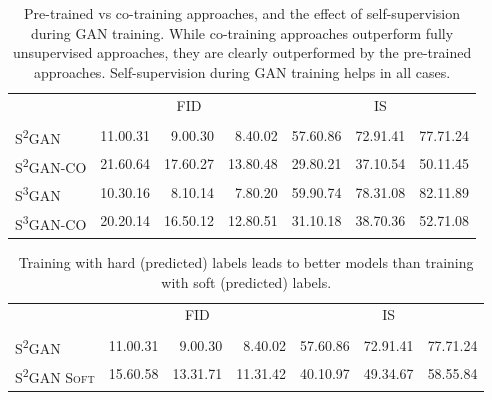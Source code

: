 \documentclass{article}
\newcommand{\cotrainSS}{\textsc{S\textsuperscript{2}GAN-CO}}
\newcommand{\cotrainSSS}{\textsc{S\textsuperscript{3}GAN-CO}}
\newcommand{\tranSS}{\textsc{S\textsuperscript{2}GAN}}
\newcommand{\tranSSS}{\textsc{S\textsuperscript{3}GAN}}
\begin{document}
\begin{table}[h!]
\centering
\caption{Pre-trained vs co-training approaches, and the effect of self-supervision during GAN training. While co-training approaches outperform fully unsupervised approaches, they are clearly outperformed by the pre-trained approaches. Self-supervision during GAN training helps in all cases.\vspace{0.2cm}}
\label{tab:transfer_vs_direct_mean_std}
\setlength\tabcolsep{4.5pt}
\begin{tabular}{lrrrrrr}
\toprule
&\multicolumn{3}{c}{\textsc{FID}} & \multicolumn{3}{c}{\textsc{IS}}\\\cmidrule(lr){2-4}\cmidrule(lr){5-7}
&         &   &    &    &   &    \\\midrule
\tranSS{}           &  11.00.31 &   9.00.30 &   8.40.02 &  57.60.86 &  72.91.41 &  77.71.24 \\
\cotrainSS{}  &  21.60.64 &  17.60.27 &  13.80.48 &  29.80.21 &  37.10.54 &  50.11.45 \\
\tranSSS{}           &  10.30.16 &   8.10.14 &   7.80.20 &  59.90.74 &  78.31.08 &  82.11.89 \\
\cotrainSSS{}  &  20.20.14 &  16.50.12 &  12.80.51 &  31.10.18 &  38.70.36 &  52.71.08 \\
\bottomrule
\end{tabular} \end{table}

\begin{table}[h!]
\centering
\caption{Training with hard (predicted) labels leads to better models than training with soft (predicted) labels.\vspace{0.2cm}}
\setlength\tabcolsep{4.5pt}
\begin{tabular}{lrrrrrr}
\toprule
&\multicolumn{3}{c}{\textsc{FID}} & \multicolumn{3}{c}{\textsc{IS}}\\\cmidrule(lr){2-4}\cmidrule(lr){5-7}
&         &   &    &    &   &    \\
\midrule
\tranSS{}       &  11.00.31 &   9.00.30 &   8.40.02 &  57.60.86 &  72.91.41 &  77.71.24 \\
\tranSS{} \textsc{Soft}  &  15.60.58 &  13.31.71 &  11.31.42 &  40.10.97 &  49.34.67 &  58.55.84 \\
\bottomrule
\end{tabular} \label{tab:soft_vs_hard_mean_std}
\end{table}
\end{document}
